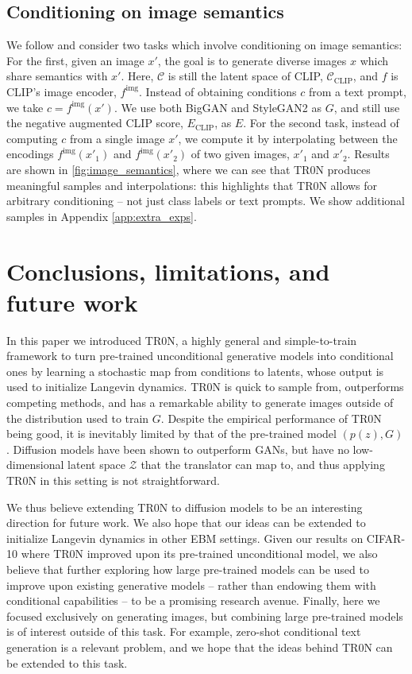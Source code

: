 \documentclass[nohyperref]{article}
\theoremstyle{plain}
\theoremstyle{definition}
\theoremstyle{remark}
\begin{document}
\subsection{Conditioning on image semantics}\label{sec:semantics}

We follow \citet{ramesh2022hierarchical} and consider two tasks which involve conditioning on image semantics: 
For the first, given an image $x'$, the goal is to generate diverse images $x$ which share semantics with $x'$. 
Here, $\mathcal{C}$ is still the latent space of CLIP, $\mathcal{C}_{\text{CLIP}}$, and $f$ is CLIP's image encoder, $f^{\text{img}}$. Instead of obtaining conditions $c$ from a text prompt, we take $c = f^{\text{img}}(x')$. We use both BigGAN and StyleGAN2 as $G$, and still use the negative augmented CLIP score, $E_{\text{CLIP}}$, as $E$. 
For the second task, instead of computing $c$ from a single image $x'$, we compute it by interpolating between the encodings $f^{\text{img}}(x'_1)$ and $f^{\text{img}}(x'_2)$ of two given images, $x'_1$ and $x'_2$. 
Results are shown in \autoref{fig:image_semantics}, where we can see that TR0N produces meaningful samples and interpolations: this highlights that TR0N allows for arbitrary conditioning -- not just class labels or text prompts. We show additional samples in Appendix \ref{app:extra_exps}.

 
\section{Conclusions, limitations, and future work}
In this paper we introduced TR0N, a highly general and simple-to-train framework to turn pre-trained unconditional generative models into conditional ones by learning a stochastic map from conditions to latents, whose output is used to initialize Langevin dynamics. TR0N is quick to sample from, outperforms competing methods, and has a remarkable ability to generate images outside of the distribution used to train $G$. 
Despite the empirical performance of TR0N being good, 
it is inevitably limited by that of the pre-trained model $(p(z), G)$. Diffusion models have been shown to outperform GANs, but have no low-dimensional latent space $\mathcal{Z}$ that the translator can map to, and thus applying TR0N in this setting is not straightforward.

We thus believe extending TR0N to diffusion models to be an interesting direction for future work. We also hope that our ideas can be extended to initialize Langevin dynamics in other EBM settings. Given our results on CIFAR-10 where TR0N improved upon its pre-trained unconditional model, we also believe that further exploring how large pre-trained models can be used to improve upon existing generative models -- rather than endowing them with conditional capabilities -- to be a promising research avenue. 
Finally, here we focused exclusively on generating images, but combining large pre-trained models is of interest outside of this task. For example, zero-shot conditional text generation \citep{su2022language} is a relevant problem, and we hope that the ideas behind TR0N can be extended to this task.
\end{document}
